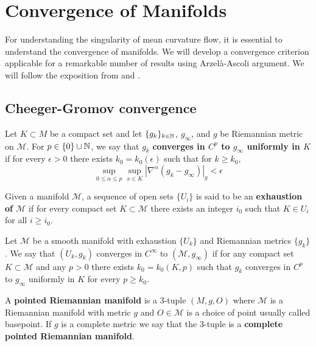 \chapter{Convergence of Manifolds}


For understanding the singularity of mean curvature flow, it is essential to understand the convergence of manifolds. We will develop a convergence criterion applicable for a remarkable number of results using Arzel\`a-Ascoli argument. We will follow the exposition from \cite{chow2007ricci} and \cite{andrews2022extrinsic}.

\section{Cheeger-Gromov convergence}

\begin{defn}
    Let $ K \subset M $ be a compact set and let $ \{g_{k}\}_{k \in \mathbb{N}} $, $ g_{\infty} $, and $ g $ be Riemannian metric on $ \mathcal{M}$. For $ p \in \{0\} \cup \mathbb{N} $, we say that $ g_{k} $ \textbf{converges in $ C^{p} $ to $ g_{\infty} $ uniformly in $ K $} if for every $ \epsilon >0 $ there exists $ k_{0} = k_{0}(\epsilon) $ such that for $ k \ge k_{0} $, 
    \[ \sup_{0 \le \alpha \le p} \sup_{x \in K}| \nabla^{\alpha}(g_{k}-g_{\infty})|_{g} < \epsilon \]
\end{defn}

Given a manifold $ \mathcal{M} $, a sequence of open sets $ \{U_{i}\} $ is said to be an \textbf{exhaustion of $ \mathcal{M} $}  if for every compact set $ K \subset \mathcal{M} $ there exists an integer $ i_{0} $ such that $ K \in U_{i} $ for all $ i \ge i_{0} $.

\begin{defn}
    Let $ \mathcal{M} $ be a smooth manifold with exhaustion $ \{U_{k}\} $ and Riemannian metrics $ \{g_{k}\} $. We say that $ (U_{k}, g_{k}) $ converges in $ C^{\infty} $ to $ (\mathcal{M}, g_{\infty}) $ if for any compact set $ K \subset \mathcal{M} $ and any $ p >0 $ there exists $ k_{0} = k_{0}(K,p) $ such that $ g_{k} $ converges in $ C^{p} $ to $ g_{\infty} $ uniformly in $ K $ for every $ p\ge k_{0} $.
\end{defn}
\begin{defn}
    A \textbf{pointed Riemannian manifold}  is a $ 3 $-tuple $ (M,g,O) $ where $ \mathcal{M} $ is a Riemannian manifold with metric $ g $ and $ O \in \mathcal{M} $ is a choice of point usually called basepoint. If $ g $ is a complete metric we say that the $ 3 $-tuple is a \textbf{complete pointed Riemannian manifold}.
\end{defn}

